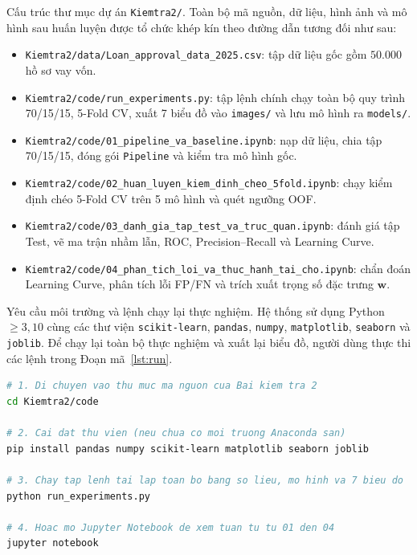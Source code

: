 \documentclass[12pt,a4paper,oneside]{report}
\begin{document}
Cấu trúc thư mục dự án \texttt{Kiemtra2/}. Toàn bộ mã nguồn, dữ liệu, hình ảnh và mô hình sau huấn luyện được tổ chức khép kín theo đường dẫn tương đối như sau:
\begin{itemize}
  \item \texttt{Kiemtra2/data/}\allowbreak\texttt{Loan\_approval\_data\_2025.csv}: tập dữ liệu gốc gồm $50.000$ hồ sơ vay vốn.
  \item \texttt{Kiemtra2/code/}\allowbreak\texttt{run\_experiments.py}: tập lệnh chính chạy toàn bộ quy trình 70/15/15, 5-Fold CV, xuất 7 biểu đồ vào \texttt{images/} và lưu mô hình ra \texttt{models/}.
  \item \texttt{Kiemtra2/code/}\allowbreak\texttt{01\_pipeline\_va\_baseline.ipynb}: nạp dữ liệu, chia tập 70/15/15, đóng gói \texttt{Pipeline} và kiểm tra mô hình gốc.
  \item \texttt{Kiemtra2/code/}\allowbreak\texttt{02\_huan\_luyen\_kiem\_dinh\_cheo\_5fold.ipynb}: chạy kiểm định chéo 5-Fold CV trên 5 mô hình và quét ngưỡng OOF.
  \item \texttt{Kiemtra2/code/}\allowbreak\texttt{03\_danh\_gia\_tap\_test\_va\_truc\_quan.ipynb}: đánh giá tập Test, vẽ ma trận nhầm lẫn, ROC, Precision--Recall và Learning Curve.
  \item \texttt{Kiemtra2/code/}\allowbreak\texttt{04\_phan\_tich\_loi\_va\_thuc\_hanh\_tai\_cho.ipynb}: chẩn đoán Learning Curve, phân tích lỗi FP/FN và trích xuất trọng số đặc trưng $\mathbf{w}$.
\end{itemize}

Yêu cầu môi trường và lệnh chạy lại thực nghiệm. Hệ thống sử dụng Python $\ge 3{,}10$ cùng các thư viện \texttt{scikit-learn}, \texttt{pandas}, \texttt{numpy}, \texttt{matplotlib}, \texttt{seaborn} và \texttt{joblib}. Để chạy lại toàn bộ thực nghiệm và xuất lại biểu đồ, người dùng thực thi các lệnh trong Đoạn mã~\ref{lst:run}.

\begin{lstlisting}[language=bash,caption={Cài đặt phụ thuộc và chạy lại toàn bộ thực nghiệm Bài kiểm tra 2.},label={lst:run}]
# 1. Di chuyen vao thu muc ma nguon cua Bai kiem tra 2
cd Kiemtra2/code

# 2. Cai dat thu vien (neu chua co moi truong Anaconda san)
pip install pandas numpy scikit-learn matplotlib seaborn joblib

# 3. Chay tap lenh tai lap toan bo bang so lieu, mo hinh va 7 bieu do
python run_experiments.py

# 4. Hoac mo Jupyter Notebook de xem tuan tu tu 01 den 04
jupyter notebook
\end{lstlisting}
\end{document}
